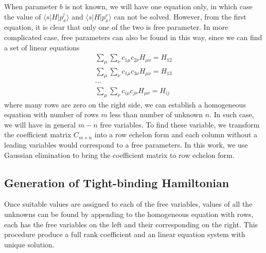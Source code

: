 \documentclass{article}
\begin{document}
When parameter $b$ is not known, we will have one equation only, in which case the value of $\langle s | H | p_x^l \rangle$ and 
$\langle s | H | p_x^r \rangle$ can not be solved. However, from the first equation, it is clear that only one of the two 
is free parameter. In more complicated case, free parameters can also be found in this way, since we can find a set of linear equations
\begin{gather}
    \sum_{\mu} \sum_{\nu} c_{1\mu} c_{2\nu} H_{\mu\nu} = H_{12} \\
    \sum_{\mu} \sum_{\nu} c_{1\mu} c_{3\nu} H_{\mu\nu} = H_{13} \\
    \cdots \\
    \sum_{\mu} \sum_{\nu} c_{i\mu} c_{j\nu} H_{\mu\nu} = H_{ij} 
\end{gather}
where many rows are zero on the right side, we can establish a homogeneous equation with number of rows $m$ less than number of 
unknown $n$. In such case, we will have in general $m-n$ free variables. To find these variable, we transform the 
coefficient matrix $C_{m\times n}$ into a row echelon form and each column without a leading variables would correspond to 
a free parameters. In this work, we use Gaussian elimination to bring the coefficient matrix to row echelon form.

\subsection{Generation of Tight-binding Hamiltonian}
Once suitable values are assigned to each of the free variables, values of all the unknowns can be found by appending to the homogeneous 
equation with rows, each has the free variables on the left and their corresponding on the right. This procedure produce a full rank 
coefficient and an linear equation system with unique solution. 
\end{document}
